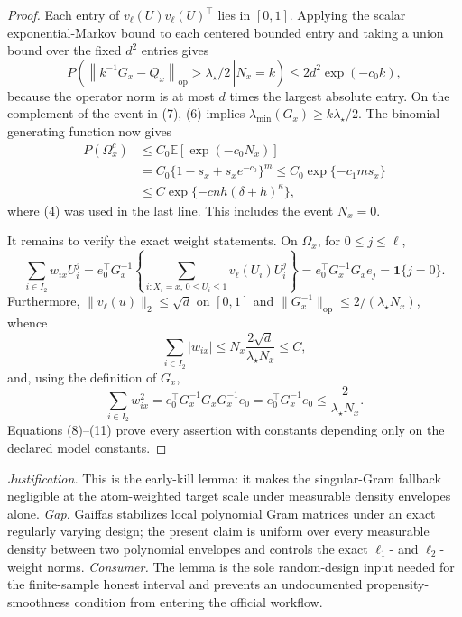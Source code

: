 \documentclass{article}
\begin{document}
\begin{proof}
Each entry of \(v_\ell(U)v_\ell(U)^\top\) lies in \([0,1]\).  Applying the scalar exponential-Markov bound to each centered bounded entry and taking a union bound over the fixed \(d^2\) entries gives
\[
 P\left(\left.\left\|k^{-1}G_x-Q_x\right\|_{\mathrm{op}}>\lambda_\star/2\,\right|N_x=k\right)
 \leq 2d^2\exp(-c_0k), \tag{7}
\]
because the operator norm is at most \(d\) times the largest absolute entry.  On the complement of the event in (7), (6) implies \(\lambda_{\min}(G_x)\geq k\lambda_\star/2\).  The binomial generating function now gives
\[
 \begin{aligned}
 P(\Omega_x^c)
 &\leq C_0\mathbb E[\exp(-c_0N_x)]\\
 &=C_0\{1-s_x+s_xe^{-c_0}\}^{m}
 \leq C_0\exp\{-c_1ms_x\}\\
 &\leq C\exp\{-cnh(\delta+h)^\kappa\},
 \end{aligned} \tag{8}
\]
where (4) was used in the last line.  This includes the event \(N_x=0\).

It remains to verify the exact weight statements.  On \(\Omega_x\), for \(0\leq j\leq\ell\),
\[
 \sum_{i\in I_2}w_{ix}U_i^j
 =e_0^\top G_x^{-1}\left\{\sum_{i:X_i=x,\,0\leq U_i\leq1}v_\ell(U_i)U_i^j\right\}
 =e_0^\top G_x^{-1}G_xe_j
 =\mathbf 1\{j=0\}. \tag{9}
\]
Furthermore, \(\lVert v_\ell(u)\rVert_2\leq\sqrt d\) on \([0,1]\) and \(\lVert G_x^{-1}\rVert_{\mathrm{op}}\leq2/(\lambda_\star N_x)\), whence
\[
 \sum_{i\in I_2}|w_{ix}|
 \leq N_x\frac{2\sqrt d}{\lambda_\star N_x}
 \leq C, \tag{10}
\]
and, using the definition of \(G_x\),
\[
 \sum_{i\in I_2}w_{ix}^2
 =e_0^\top G_x^{-1}G_xG_x^{-1}e_0
 =e_0^\top G_x^{-1}e_0
 \leq\frac{2}{\lambda_\star N_x}. \tag{11}
\]
Equations (8)--(11) prove every assertion with constants depending only on the declared model constants.
\end{proof}
\par\smallskip\noindent \textit{Justification.} This is the early-kill lemma: it makes the singular-Gram fallback negligible at the atom-weighted target scale under measurable density envelopes alone. \textit{Gap.} Gaiffas stabilizes local polynomial Gram matrices under an exact regularly varying design; the present claim is uniform over every measurable density between two polynomial envelopes and controls the exact \(\ell_1\)- and \(\ell_2\)-weight norms. \textit{Consumer.} The lemma is the sole random-design input needed for the finite-sample honest interval and prevents an undocumented propensity-smoothness condition from entering the official workflow.
\end{document}
